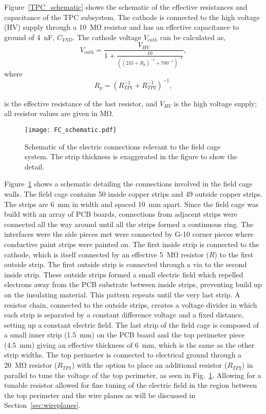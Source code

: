 Figure~\ref{TPC_schematic} shows the schematic of the effective resistances and capacitance of the TPC subsystem. The cathode is connected to the high voltage (HV) supply through a \SI{10}{\mega\ohm} resistor and has an effective capacitance to ground of \SI{4}{\nano\farad}, $C_{VSD}$. The cathode voltage $V_{cath}$ can be calculated as,
\begin{equation}
V_{cath} = \frac{V_{HV}}{ 1 + \frac{10}{ \left( (245 + R_p)^{-1} + 700^{-1} \right)^{-1} } },
\end{equation}
where 
\begin{equation}
R_p = \left( R_{TP1}^{-1} + R_{TP2}^{-1} \right)^{-1},
 \label{eq:Reff}
\end{equation} 

is the effective resistance of the last resistor, and $V_{HV}$ is the high voltage supply; all resistor values are given in \si{\mega\ohm}.


\begin{figure}[!htb]
\centering
\texttt{[image: FC\_schematic.pdf]}
\caption{Schematic of the electric connections relevant to the field cage system. The strip thickness is exaggerated in the figure to show the detail.}
\label{fig:FC_schematic}
\end{figure}

Figure~\ref{fig:FC_schematic} shows a schematic detailing the connections involved in the field cage walls. The field cage contains 50 inside copper strips and 49 outside copper strips. The strips are \SI{6}{\milli\metre} in width and spaced \SI{10}{\milli\metre} apart. Since the field cage was build with an array of PCB boards, connections from adjacent strips were connected all the way around until all the strips formed a continuous ring. The interfaces were the side pieces met were connected by G-10 corner pieces where conductive paint strips were painted on. The first inside strip is connected to the cathode, which is itself connected by an effective \SI{5}{\mega\ohm} resistor ($R$) to the first outside strip. The first outside strip is connected through a via to the second inside strip. These outside strips formed a small electric field which repelled electrons away from the PCB substrate between inside strips, preventing build up on the insulating material. This pattern repeats until the very last strip. A resistor chain, connected to the outside strips, creates a voltage divider in which each strip is separated by a constant difference voltage and a fixed distance, setting up a constant electric field. The last strip of the field cage is composed of a small inner strip  (\SI{1.5}{\milli\metre}) on the PCB board and the top perimeter piece (\SI{4.5}{\milli\metre}) giving an  effective thickness of \SI{6}{\milli\metre}, which is the same as the other strip widths. The top perimeter is connected to electrical ground through a \SI{20}{\mega\ohm} resistor ($R_{TP1}$) with the option to place an additional resistor ($R_{TP2}$) in parallel to tune the voltage of the top perimeter, as seen in Fig.~\ref{fig:FC_schematic}. Allowing for a tunable resistor allowed for fine tuning of the electric field in the region between the top perimeter and the wire planes as will be discussed in Section~\ref{sec:wireplanes}. 

